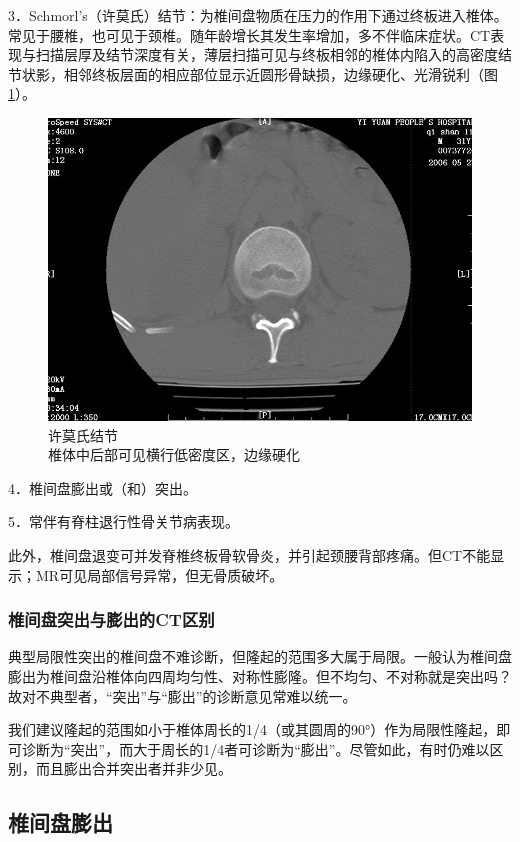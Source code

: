 3．Schmorl's（许莫氏）结节：为椎间盘物质在压力的作用下通过终板进入椎体。常见于腰椎，也可见于颈椎。随年龄增长其发生率增加，多不伴临床症状。CT表现与扫描层厚及结节深度有关，薄层扫描可见与终板相邻的椎体内陷入的高密度结节状影，相邻终板层面的相应部位显示近圆形骨缺损，边缘硬化、光滑锐利（图\ref{fig23-5}）。

\begin{figure}[!htbp]
 \centering
 \includegraphics[width=.7\textwidth,height=\textheight,keepaspectratio]{./images/Image00468.jpg}
 \captionsetup{justification=centering}
 \caption{许莫氏结节\\{\small 椎体中后部可见横行低密度区，边缘硬化}}
 \label{fig23-5}
  \end{figure} 

4．椎间盘膨出或（和）突出。

5．常伴有脊柱退行性骨关节病表现。

此外，椎间盘退变可并发脊椎终板骨软骨炎，并引起颈腰背部疼痛。但CT不能显示；MR可见局部信号异常，但无骨质破坏。

\subsubsection{椎间盘突出与膨出的CT区别}

典型局限性突出的椎间盘不难诊断，但隆起的范围多大属于局限。一般认为椎间盘膨出为椎间盘沿椎体向四周均匀性、对称性膨隆。但不均匀、不对称就是突出吗？故对不典型者，“突出”与“膨出”的诊断意见常难以统一。

我们建议隆起的范围如小于椎体周长的1/4（或其圆周的90°）作为局限性隆起，即可诊断为“突出”，而大于周长的1/4者可诊断为“膨出”。尽管如此，有时仍难以区别，而且膨出合并突出者并非少见。

\subsection{椎间盘膨出}

